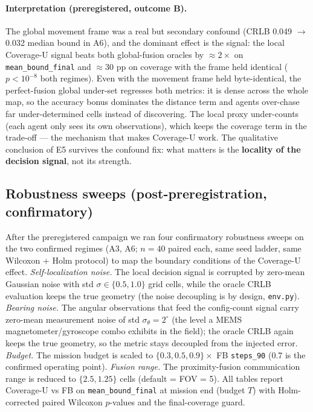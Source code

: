 \documentclass[journal]{IEEEtran}
\newcommand{\CU}{Coverage-U}
\begin{document}
\paragraph{Interpretation (preregistered, outcome B).}
The global movement frame was a real but secondary confound (CRLB
0.049 $\rightarrow$ 0.032 median bound in A6), and the dominant effect is the
signal: the local \CU{} signal beats both global-fusion oracles by $\approx 2\times$
on \texttt{mean\_bound\_final} and $\approx$30 pp on coverage with the frame
held identical ($p < 10^{-8}$ both regimes). Even with the movement frame held
byte-identical, the perfect-fusion global under-set regresses both metrics: it
is dense across the whole map, so the accuracy bonus dominates the distance
term and agents over-chase far under-determined cells instead of discovering.
The local proxy under-counts (each agent only sees its own observations),
which keeps the coverage term in the trade-off --- the mechanism that makes
\CU{} work. The qualitative conclusion of E5 survives the confound fix: what
matters is the \textbf{locality of the decision signal}, not its strength.

\subsection{Robustness sweeps (post-preregistration, confirmatory)}
After the preregistered campaign we ran four confirmatory robustness sweeps on
the two confirmed regimes (A3, A6; $n = 40$ paired each, same seed ladder, same
Wilcoxon + Holm protocol) to map the boundary conditions of the \CU{} effect.
\emph{Self-localization noise.} The local decision signal is corrupted by
zero-mean Gaussian noise with std $\sigma \in \{0.5, 1.0\}$ grid cells, while
the oracle CRLB evaluation keeps the true geometry (the noise decoupling is by
design, \texttt{env.py}). \emph{Bearing noise.} The angular observations that
feed the config-count signal carry zero-mean measurement noise of std
$\sigma_\theta = 2^\circ$ (the level a MEMS magnetometer/gyroscope combo
exhibits in the field); the oracle CRLB again keeps the true geometry, so the
metric stays decoupled from the injected error. \emph{Budget.} The mission
budget is scaled to $\{0.3, 0.5, 0.9\} \times$ FB \texttt{steps\_90} (0.7 is
the confirmed operating point). \emph{Fusion range.} The proximity-fusion
communication range is reduced to $\{2.5, 1.25\}$ cells (default =
FOV = 5). All tables report \CU{} vs FB on \texttt{mean\_bound\_final} at
mission end (budget $T$) with Holm-corrected paired Wilcoxon $p$-values and the
final-coverage guard.
\end{document}
